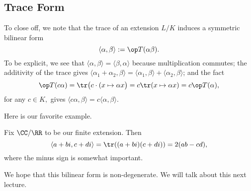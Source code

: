 \documentclass[../notes.tex]{subfiles}
\begin{document}


\subsection{Trace Form}
To close off, we note that the trace of an extension $L/K$ induces a symmetric bilinear form
\[\langle\alpha,\beta\rangle:=\op T(\alpha\beta).\]
To be explicit, we see that $\langle\alpha,\beta\rangle=\langle\beta,\alpha\rangle$ because multiplication commutes; the additivity of the trace gives $\langle\alpha_1+\alpha_2,\beta\rangle=\langle\alpha_1,\beta\rangle+\langle\alpha_2,\beta\rangle$; and the fact
\[\op T(c\alpha)=\tr\big(c\cdot(x\mapsto\alpha x\big)=c\tr(x\mapsto\alpha x)=c\op T(\alpha),\]
for any $c\in K,$ gives $\langle c\alpha,\beta\rangle=c\langle\alpha,\beta\rangle.$

Here is our favorite example.
\begin{example}
	Fix $\CC/\RR$ to be our finite extension. Then
	\[\langle a+bi,c+di\rangle=\tr ((a+bi)(c+di))=2(ab-cd),\]
	where the minus sign is somewhat important.
\end{example}
We hope that this bilinear form is non-degenerate. We will talk about this next lecture.
\end{document}
